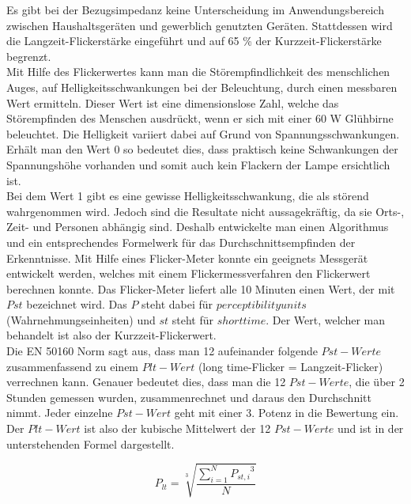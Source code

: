 Es gibt bei der Bezugsimpedanz keine Unterscheidung im Anwendungsbereich zwischen Haushaltsgeräten und gewerblich genutzten Geräten. Stattdessen wird die Langzeit-Flickerstärke eingeführt und auf 65 \% der Kurzzeit-Flickerstärke begrenzt.\\
Mit Hilfe des Flickerwertes kann man die Störempfindlichkeit des menschlichen Auges, auf Helligkeitsschwankungen bei der Beleuchtung, durch einen messbaren Wert ermitteln. Dieser Wert ist eine dimensionslose Zahl, welche das Störempfinden des Menschen ausdrückt, wenn er sich mit einer 60 W Glühbirne beleuchtet. Die Helligkeit variiert dabei auf Grund von Spannungsschwankungen.
Erhält man den Wert 0 so bedeutet dies, dass praktisch keine Schwankungen der Spannungshöhe vorhanden und somit auch kein Flackern der Lampe ersichtlich ist.\\
Bei dem Wert 1 gibt es eine gewisse Helligkeitsschwankung, die als störend wahrgenommen wird. Jedoch sind die Resultate nicht aussagekräftig, da sie Orts-, Zeit- und Personen abhängig sind. Deshalb entwickelte man einen Algorithmus und ein entsprechendes Formelwerk für das Durchschnittsempfinden der Erkenntnisse. Mit Hilfe eines Flicker-Meter konnte ein geeignets Messgerät entwickelt werden, welches mit einem Flickermessverfahren den Flickerwert berechnen konnte. Das Flicker-Meter liefert alle 10 Minuten einen Wert, der mit $Pst$ bezeichnet wird. Das $P$ steht dabei für $perceptibility units$ (Wahrnehmungseinheiten) und $st$ steht für $short time$. Der Wert, welcher man behandelt ist also der Kurzzeit-Flickerwert.\\
Die EN 50160 Norm sagt aus, dass man 12 aufeinander folgende $Pst-Werte$ zusammenfassend zu einem $Plt-Wert$ (long time-Flicker = Langzeit-Flicker) verrechnen kann. Genauer bedeutet dies, dass man die 12 $Pst-Werte$, die über 2 Stunden gemessen wurden, zusammenrechnet und daraus den Durchschnitt nimmt. Jeder einzelne $Pst-Wert$ geht mit einer 3. Potenz in die Bewertung ein. Der $Plt-Wert$ ist also der kubische Mittelwert der 12 $Pst-Werte$ und ist in der unterstehenden Formel dargestellt.


\begin{equation}\label{eq:THDi}
P_{lt} = {\sqrt[3]{\frac{\sum_{i=1}^{N} {P_{st,i}}^3}{N}}}
\end{equation}


